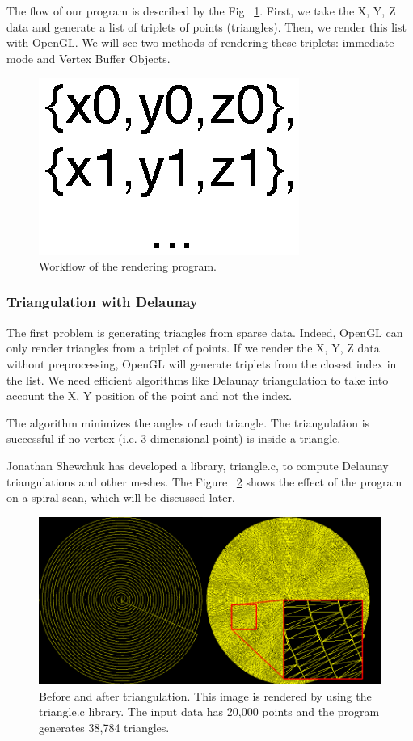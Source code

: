 The flow of our program is described by the Fig ~\ref{fig:timelinerendering}. First, we take the X, Y, Z data and generate a list of triplets of points (triangles). Then, we render this list with OpenGL. We will see two methods of rendering these triplets: immediate mode and Vertex Buffer Objects.

\begin{figure}[!ht]
  \centering
  \includegraphics[scale=0.40]{images/timelinerendering.eps}
    \caption{Workflow of the rendering program.}
  \label{fig:timelinerendering}
\end{figure}


\subsubsection{Triangulation with Delaunay}

The first problem is generating triangles from sparse data. Indeed, OpenGL can only render triangles from a triplet of points. If we render the X, Y, Z data without preprocessing, OpenGL will generate triplets from the closest index in the list. We need efficient algorithms like Delaunay triangulation to take into account the X, Y position of the point and not the index.

The algorithm minimizes the angles of each triangle. The triangulation is successful if no vertex (i.e. 3-dimensional point) is inside a triangle.

Jonathan Shewchuk \cite{shewchuk96b} has developed a library, triangle.c, to compute Delaunay triangulations and other meshes. The Figure ~\ref{triangulation2d} shows the effect of the program on a spiral scan, which will be discussed later. 
\begin{figure}[!ht]
  \centering
  \includegraphics[scale=0.45]{images/triangulation.png}
    \caption{Before and after triangulation. This image is rendered by using the triangle.c library. The input data has 20,000 points and the program generates 38,784 triangles.}
  \label{triangulation2d}
\end{figure}

